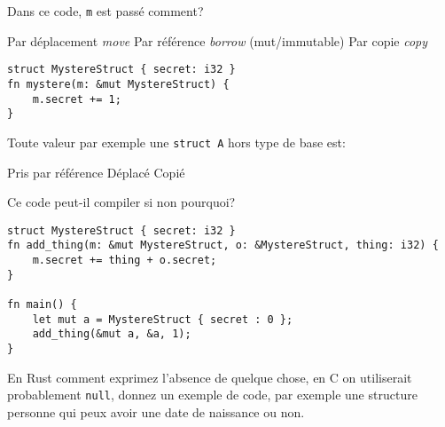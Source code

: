 \documentclass[11pt,a4paper,addpoint]{exam}
\begin{document}
\begin{questions}
\question[1] Dans ce code, \texttt{m} est passé comment?
\begin{checkboxes}
    \CorrectChoice Par déplacement \textit{move}
    \choice Par référence \textit{borrow} (mut/immutable)
    \choice Par copie \textit{copy}
\end{checkboxes}
\begin{verbatim}
struct MystereStruct { secret: i32 }
fn mystere(m: &mut MystereStruct) {
    m.secret += 1;
}
\end{verbatim}

\question[1] Toute valeur par exemple une \texttt{struct A} hors type de base est:
 \begin{checkboxes}
    \choice Pris par référence
    \CorrectChoice Déplacé
    \choice Copié
\end{checkboxes}

\question[1] Ce code peut-il compiler si non pourquoi?
\begin{verbatim}
struct MystereStruct { secret: i32 }
fn add_thing(m: &mut MystereStruct, o: &MystereStruct, thing: i32) {
    m.secret += thing + o.secret;
}

fn main() {
    let mut a = MystereStruct { secret : 0 };
    add_thing(&mut a, &a, 1);
}
\end{verbatim}
\vspace{2in}



\question[1] En Rust comment exprimez l'absence de quelque chose, en C on utiliserait probablement \texttt{null}, 
donnez un exemple de code, par exemple une structure personne qui peux avoir une date de naissance ou non.
\vspace{1in}


\end{questions}
\end{document}
